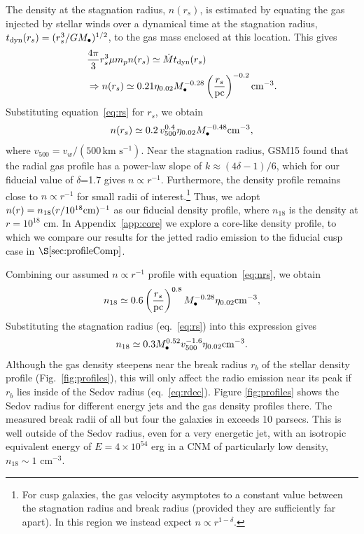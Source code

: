 \documentclass[usenatbib,fleqn]{mnras}
\newcommand{\Mbh}[1][]{M_{\bullet}}
\newcommand{\rs}{r_s}
\begin{document}
The density at the stagnation radius, $n(\rs)$, is estimated by
equating the gas injected by stellar winds over a dynamical time at
the stagnation radius, $t_{\rm dyn} (\rs)=(\rs^3/G \Mbh)^{1/2}$, to
the gas mass enclosed at this location.  This gives
\begin{align}
  &\frac{4 \pi}{3} \rs^3 \mu m_p n(r_s) \simeq \dot{M} t_{\rm dyn}
  (\rs) \nonumber\\
  &\Rightarrow n(r_s) \simeq 0.21 \eta_{0.02} \Mbh[,7]^{-0.28} \left(\frac{r_s}{\rm
      pc}\right)^{-0.2} {\rm cm}^{-3}.
\label{eq:nrs}
\end{align}
%
Substituting equation~\eqref{eq:rs} for $r_s$, we obtain 
\begin{equation}
n(r_s) \simeq 0.2 \, v_{500}^{0.4} \eta_{0.02} \Mbh[,7]^{-0.48} {\rm cm}^{-3},
\label{eq:nrs2}
\end{equation}
where $v_{500}=v_w/\left(500 \,\mathrm{km\,\,
    s^{-1}}\right)$. 
%
Near the stagnation radius, GSM15 found that the radial gas profile
has a power-law slope of $k \approx (4\delta-1)/6$, which for our
fiducial value of $\delta$=1.7 gives $n \propto r^{-1}$. Furthermore,
the density profile remains close to $n\propto r^{-1}$ for small radii
of interest.\footnote{For cusp galaxies, the gas velocity asymptotes
  to a constant value between the stagnation radius and break radius
  (provided they are sufficiently far apart). In this region we
  instead expect $n\propto r^{1-\delta}$.}  Thus, we adopt $n(r)=
n_{18} (r/10^{18} {\rm cm})^{-1}$ as our fiducial density profile,
where $n_{18}$ is the density at $r = 10^{18}$ cm.  In
Appendix~\ref{app:core} we explore a core-like density profile, to
which we compare our results for the jetted radio emission to the
fiducial cusp case in $\S\ref{sec:profileComp}$.

Combining our assumed $n\propto r^{-1}$ profile with
equation~\eqref{eq:nrs}, we obtain
\begin{equation}
  n_{18}\simeq 0.6 \left(\frac{r_s}{\rm pc}\right)^{0.8}
  \Mbh[,7]^{-0.28} \eta_{0.02} {\rm cm^{-3}},
  \label{eq:n18}
\end{equation}
%
Substituting the stagnation radius (eq.~\ref{eq:rs}) into this
expression gives
\begin{equation}
  n_{18}\simeq 0.3 \Mbh[,7]^{0.52} v_{500}^{-1.6} \eta_{0.02} {\rm
    cm^{-3}}.
\label{eq:n182}
\end{equation} 
%
Although the gas density steepens near the break radius $r_b$ of the
stellar density profile (Fig.~\ref{fig:profiles}), this will only
affect the radio emission near its peak if $r_b$ lies inside of the
Sedov radius (eq.~\ref{eq:rdec}).  Figure \ref{fig:profiles} shows the
Sedov radius for different energy jets and the gas density profiles
there.  The measured break radii of all but four the galaxies in
\citet{Lauer+2007} exceeds 10 parsecs.  This is well outside of the
Sedov radius, even for a very energetic jet, with an isotropic
equivalent energy of $E=4\times 10^{54}$ erg in a CNM of particularly
low density, $n_{18} \sim 1$ cm$^{-3}$.
\end{document}
